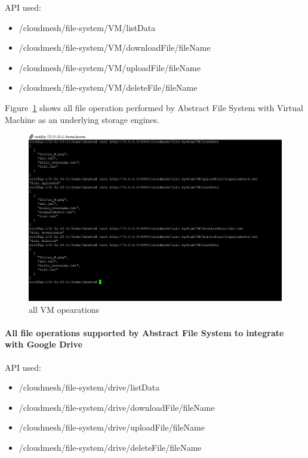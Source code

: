 API used:
\begin{itemize}
    \item /cloudmesh/file-system/VM/listData
    \item /cloudmesh/file-system/VM/downloadFile/{fileName}
    \item /cloudmesh/file-system/VM/uploadFile/{fileName}
    \item /cloudmesh/file-system/VM/deleteFile/{fileName}
\end{itemize}

Figure~\ref{fig:VM} shows all file operation performed by Abstract 
File System with Virtual Machine as an underlying storage engines. 

\begin{figure}[!ht]
        \centering\includegraphics[width=\columnwidth]
        {image/VM.JPG}
        \caption{all VM opearations}\label{fig:VM}
\end{figure}


\paragraph{All file operations supported by Abstract File System 
to integrate with Google Drive}


API used:
\begin{itemize}

    \item /cloudmesh/file-system/drive/listData
    \item /cloudmesh/file-system/drive/downloadFile/{fileName}
    \item /cloudmesh/file-system/drive/uploadFile/{fileName}
    \item /cloudmesh/file-system/drive/deleteFile/{fileName}

\end{itemize}

